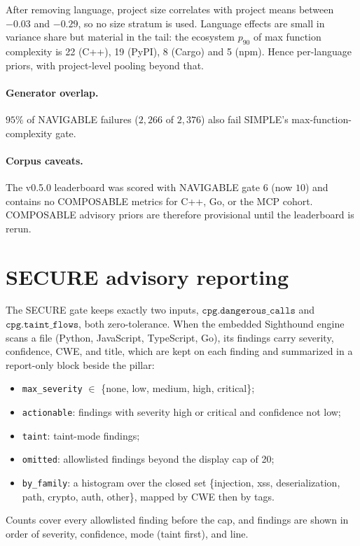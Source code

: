 \documentclass[11pt]{article}
\theoremstyle{remark}
\begin{document}
After removing language, project size correlates with project means between
$-0.03$ and $-0.29$, so no size stratum is used. Language effects are small in
variance share but material in the tail: the ecosystem $p_{90}$ of max function
complexity is 22 (C++), 19 (PyPI), 8 (Cargo) and 5 (npm). Hence per-language
priors, with project-level pooling beyond that.

\paragraph{Generator overlap.} $95\%$ of NAVIGABLE failures ($2{,}266$ of
$2{,}376$) also fail SIMPLE's max-function-complexity gate.

\paragraph{Corpus caveats.} The v0.5.0 leaderboard was scored with NAVIGABLE
gate $6$ (now $10$) and contains no COMPOSABLE metrics for C++, Go, or the MCP
cohort. COMPOSABLE advisory priors are therefore provisional until the
leaderboard is rerun.

\section{SECURE advisory reporting}

The SECURE gate keeps exactly two inputs, $\texttt{cpg.dangerous\_calls}$ and
$\texttt{cpg.taint\_flows}$, both zero-tolerance. When the embedded Sighthound
engine scans a file (Python, JavaScript, TypeScript, Go), its findings carry
severity, confidence, CWE, and title, which are kept on each finding and
summarized in a report-only block beside the pillar:
\begin{itemize}
\item \texttt{max\_severity} $\in$ \{none, low, medium, high, critical\};
\item \texttt{actionable}: findings with severity high or critical and
  confidence not low;
\item \texttt{taint}: taint-mode findings;
\item \texttt{omitted}: allowlisted findings beyond the display cap of 20;
\item \texttt{by\_family}: a histogram over the closed set \{injection, xss,
  deserialization, path, crypto, auth, other\}, mapped by CWE then by tags.
\end{itemize}
Counts cover every allowlisted finding before the cap, and findings are shown
in order of severity, confidence, mode (taint first), and line.
\end{document}
